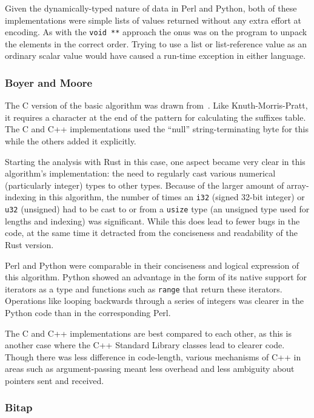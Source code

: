 Given the dynamically-typed nature of data in Perl and Python, both of these implementations were simple lists of values returned without any extra effort at encoding. As with the \texttt{void~**} approach the onus was on the program to unpack the elements in the correct order. Trying to use a list or list-reference value as an ordinary scalar value would have caused a run-time exception in either language.

\subsubsection{Boyer and Moore}

The C version of the basic algorithm was drawn from~\cite[Chapter 14]{handbook}. Like Knuth-Morris-Pratt, it requires a character at the end of the pattern for calculating the suffixes table. The C and C++ implementations used the ``null'' string-terminating byte for this while the others added it explicitly.

Starting the analysis with Rust in this case, one aspect became very clear in this algorithm's implementation: the need to regularly cast various numerical (particularly integer) types to other types. Because of the larger amount of array-indexing in this algorithm, the number of times an \texttt{i32} (signed 32-bit integer) or \texttt{u32} (unsigned) had to be cast to or from a \texttt{usize} type (an unsigned type used for lengths and indexing) was significant. While this does lead to fewer bugs in the code, at the same time it detracted from the conciseness and readability of the Rust version.

Perl and Python were comparable in their conciseness and logical expression of this algorithm. Python showed an advantage in the form of its native support for iterators as a type and functions such as \texttt{range} that return these iterators. Operations like looping backwards through a series of integers was clearer in the Python code than in the corresponding Perl.

The C and C++ implementations are best compared to each other, as this is another case where the C++ Standard Library classes lead to clearer code. Though there was less difference in code-length, various mechanisms of C++ in areas such as argument-passing meant less overhead and less ambiguity about pointers sent and received.

\subsubsection{Bitap}

